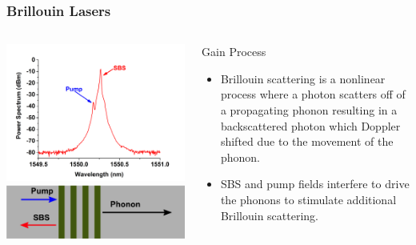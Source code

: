 \documentclass{beamer}
\begin{document}
\begin{frame}\frametitle{Brillouin Lasers}
\begin{columns}
\includegraphics[width=1.0\textwidth,keepaspectratio]{Images/SBS_Optical_Spectrum.png}\\
\includegraphics[width=1.0\textwidth,keepaspectratio]{Images/SBS_Figure.png}
\begin{block}{Gain Process}
\begin{itemize}
\item Brillouin scattering is a nonlinear process where a photon scatters off of a propagating phonon resulting in a backscattered photon
which Doppler shifted due to the movement of the phonon.
\item SBS and pump fields interfere to drive the phonons to stimulate additional Brillouin scattering.
\end{itemize}
\end{block}
\end{columns}
\end{frame}
\end{document}
